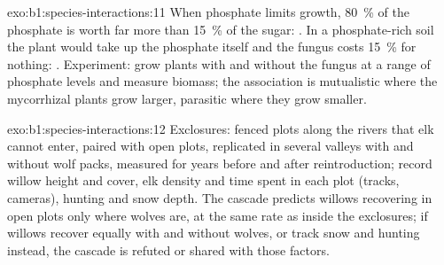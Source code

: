\begin{solution}{exo:b1:species-interactions:11}
When phosphate limits growth, \qty{80}{\%} of the phosphate is worth
far more than \qty{15}{\%} of the sugar: . In a phosphate-rich
soil the plant would take up the phosphate itself and the fungus
costs \qty{15}{\%} for nothing: . Experiment: grow plants
with and without the fungus at a range of phosphate levels and
measure biomass; the association is mutualistic where the mycorrhizal
plants grow larger, parasitic where they grow smaller.
\end{solution}

\begin{solution}{exo:b1:species-interactions:12}
Exclosures: fenced plots along the rivers that elk cannot enter,
paired with open plots, replicated in several valleys with and
without wolf packs, measured for years before and after
reintroduction; record willow height and cover, elk density and time
spent in each plot (tracks, cameras), hunting and snow depth. The
cascade predicts willows recovering in open plots only where wolves
are, at the same rate as inside the exclosures; if willows recover
equally with and without wolves, or track snow and hunting instead,
the cascade is refuted or shared with those factors.
\end{solution}

